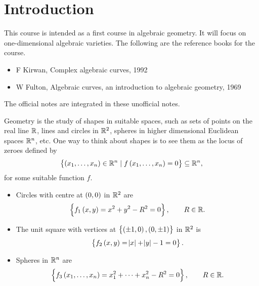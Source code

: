 \def\syllabus{Affine plane algebraic curves. Projective space. Plane projective curves. Projectivisation. Points at infinity. Singularities. Smoothness. Intersections of plane curves. Resultants. Multiplicities. B\'ezout's theorem. Conics. Cubic curves. Riemann surfaces. Genus. Ramification. The Riemann-Hurwitz formula. The degree-genus formula.}
\def\thm{section}







\setcounter{section}{0}

\section{Introduction}


This course is intended as a first course in algebraic geometry. It will focus on one-dimensional algebraic varieties. The following are the reference books for the course.
\begin{itemize}
\item F Kirwan, Complex algebraic curves, 1992
\item W Fulton, Algebraic curves, an introduction to algebraic geometry, 1969
\end{itemize}

\begin{note*}
The official notes are integrated in these unofficial notes.
\end{note*}

Geometry is the study of shapes in suitable spaces, such as sets of points on the real line $ \mathbb{R} $, lines and circles in $ \mathbb{R}^2 $, spheres in higher dimensional Euclidean spaces $ \mathbb{R}^n $, etc. One way to think about shapes is to see them as the locus of zeroes defined by
$$ \cbr{\br{x_1, \dots, x_n} \in \R^n \mid f\br{x_1, \dots, x_n} = 0} \subseteq \R^n, $$
for some suitable function $ f $.

\begin{example}
\label{eg:1.1}
\hfill
\begin{itemize}
\item Circles with centre at $ \br{0, 0} $ in $ \mathbb{R}^2 $ are
$$ \cbr{f_1\br{x, y} = x^2 + y^2 - R^2 = 0}, \qquad R \in \R. $$
\item The unit square with vertices at $ \cbr{\br{\pm 1, 0}, \br{0, \pm 1}} $ in $ \mathbb{R}^2 $ is
$$ \cbr{f_2\br{x, y} = \abs{x} + \abs{y} - 1 = 0}. $$
\item Spheres in $ \mathbb{R}^n $ are
$$ \cbr{f_3\br{x_1, \dots, x_n} = x_1^2 + \dots + x_n^2 - R^2 = 0}, \qquad R \in \R. $$
\end{itemize}
\end{example}

